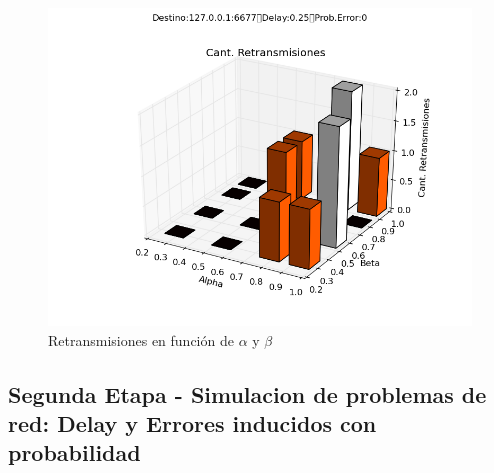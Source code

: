 \begin{figure}[H]
  \centering	
	\includegraphics[scale=0.5]{../analisis/graficos_tablas/graficos_en_funcion_de_alfa_y_beta/graficos/retransmisiones.png}
  \caption{Retransmisiones en funci\'on de $\alpha$ y $\beta$}
	\label{fig:histo-src-sitiotrabajo}
\end{figure}

\subsection{Segunda Etapa - Simulacion de problemas de red: Delay y Errores inducidos con probabilidad}